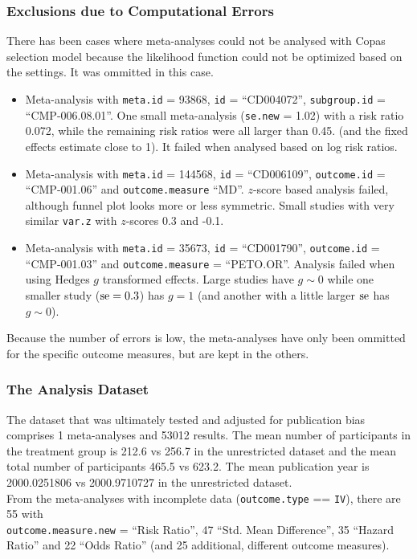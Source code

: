 \documentclass[11pt,a4paper,twoside]{book}\usepackage[]{graphicx}\usepackage[]{color}
\begin{document}
\subsubsection{Exclusions due to Computational Errors}
There has been cases where meta-analyses could not be analysed with Copas selection model because the likelihood function could not be optimized based on the settings. It was ommitted in this case.\\
\begin{itemize}
\item Meta-analysis with \texttt{meta.id} = 93868,  \texttt{id} = ``CD004072'', \texttt{subgroup.id} = ``CMP-006.08.01''. One small meta-analysis (\texttt{se.new} = 1.02) with a risk ratio 0.072, while the remaining risk ratios were all larger than 0.45. (and the fixed effects estimate close to 1). It failed when analysed based on log risk ratios.
\item Meta-analysis with \texttt{meta.id} = 144568,  \texttt{id} = ``CD006109'', \texttt{outcome.id} = ``CMP-001.06'' and \texttt{outcome.measure} ``MD''. $z$-score based analysis failed, although funnel plot looks more or less symmetric. Small studies with very similar \texttt{var.z} with $z$-scores 0.3 and -0.1.
\item Meta-analysis with \texttt{meta.id} = 35673,  \texttt{id} = ``CD001790'', \texttt{outcome.id} = ``CMP-001.03'' and \texttt{outcome.measure} = ``PETO.OR''. Analysis failed when using Hedges $g$ transformed effects. Large studies have $g \sim 0$ while one smaller study ($\operatorname{se} = 0.3$) has $g = 1$ (and another with a little larger $\operatorname{se}$ has $g \sim 0$).
\end{itemize}
Because the number of errors is low, the meta-analyses have only been ommitted for the specific outcome measures, but are kept in the others. 

\subsubsection{The Analysis Dataset}
The dataset that was ultimately tested and adjusted for publication bias comprises 1 meta-analyses and 53012 results. The mean number of participants in the treatment group is 212.6 vs 256.7 in the unrestricted dataset and the mean total number of participants 465.5 vs 623.2. The mean publication year is 2000.0251806 vs 2000.9710727 in the unrestricted dataset. \\
From the meta-analyses with incomplete data (\texttt{outcome.type} == \texttt{IV}), there are 55 with \\ \texttt{outcome.measure.new} = ``Risk Ratio'', 47 ``Std. Mean Difference'',  35 ``Hazard Ratio'' and 22 ``Odds Ratio'' (and 25 additional, different outcome measures).
\end{document}
